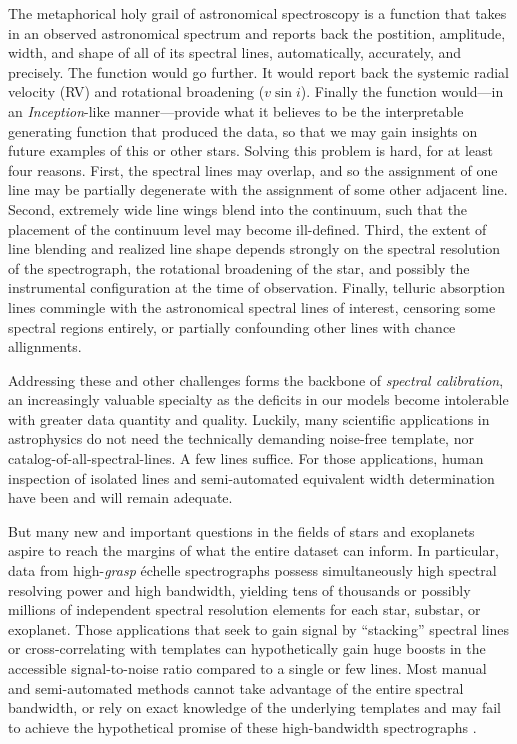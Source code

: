 \documentclass[modern]{aastex631}
\begin{document}
The metaphorical holy grail of astronomical spectroscopy is a function that takes in an observed astronomical spectrum and reports back the postition, amplitude, width, and shape of all of its spectral lines, automatically, accurately, and precisely.  The function would go further. It would report back the systemic radial velocity (RV) and rotational broadening ($v\sin{i}$).  Finally the function would---in an \emph{Inception}-like manner---provide what it believes to be the interpretable generating function that produced the data, so that we may gain insights on future examples of this or other stars.  Solving this problem is hard, for at least four reasons.  First, the spectral lines may overlap, and so the assignment of one line may be partially degenerate with the assignment of some other adjacent line.  Second, extremely wide line wings blend into the continuum, such that the placement of the continuum level may become ill-defined.  Third, the extent of line blending and realized line shape depends strongly on the spectral resolution of the spectrograph, the rotational broadening of the star, and possibly the instrumental configuration at the time of observation.  Finally, telluric absorption lines commingle with the astronomical spectral lines of interest, censoring some spectral regions entirely, or partially confounding other lines with chance allignments.

Addressing these and other challenges forms the backbone of \emph{spectral calibration}, an increasingly valuable specialty as the deficits in our models become intolerable with greater data quantity and quality.  Luckily, many scientific applications in astrophysics do not need the technically demanding noise-free template, nor catalog-of-all-spectral-lines.  A few lines suffice.  For those applications, human inspection of isolated lines and semi-automated equivalent width determination have been and will remain adequate.

But many new and important questions in the fields of stars and exoplanets aspire to reach the margins of what the entire dataset can inform.  In particular, data from high-\emph{grasp} \'echelle spectrographs possess simultaneously high spectral resolving power and high bandwidth, yielding tens of thousands or possibly millions of independent spectral resolution elements for each star, substar, or exoplanet.  Those applications that seek to gain signal by ``stacking'' spectral lines or cross-correlating with templates can hypothetically gain huge boosts in the accessible signal-to-noise ratio compared to a single or few lines.  Most manual and semi-automated methods cannot take advantage of the entire spectral bandwidth, or rely on exact knowledge of the underlying templates and may fail to achieve the hypothetical promise of these high-bandwidth spectrographs \citep{2020AJ....160..198H}.
\end{document}
